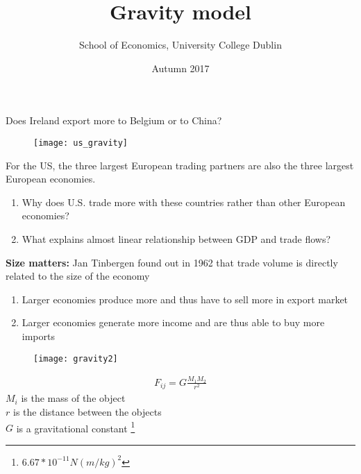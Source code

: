 \documentclass{beamer}
\title{Gravity model}
\author{School of Economics, University College Dublin}
\date{Autumn 2017}
\begin{document}
\begin{frame}
\titlepage  
\end{frame}

\begin{frame}
  Does Ireland export more to Belgium or to China?
\end{frame}

\begin{frame}
  \begin{figure}\centering
    \texttt{[image: us\_gravity]}
  \end{figure}
\end{frame}

\begin{frame}
  For the US, the three largest European trading partners are also the three largest European economies.
  \medskip  
  \begin{enumerate}
    \item Why does U.S. trade more with these countries rather than other European economies?
    \item What explains almost linear relationship between GDP and trade flows?
  \end{enumerate}
\end{frame}

\begin{frame}
  \textbf{Size matters:}
  Jan Tinbergen found out in 1962 that trade volume is directly related to the size of the economy 
  \medskip
    \begin{enumerate}
      \item Larger economies produce more and thus have to sell more in export market
      \item Larger economies generate more income and are thus able to buy more imports
    \end{enumerate}
\end{frame}

\begin{frame}
\begin{figure}
  \texttt{[image: gravity2]}
\end{figure}
  \begin{align*}
    F_{ij} = G \frac{M_1 M_2}{r^2}
  \end{align*}
$M_i$ is the mass of the object\\
$r$ is the distance between the objects\\
$G$ is a gravitational constant \footnote{$6.67*10^{-11} N(m/kg)^2$}
\end{frame}
\end{document}
